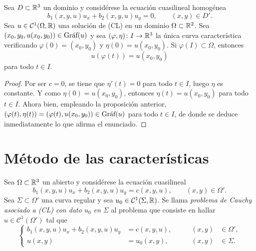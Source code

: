 \documentclass[a4paper, 12pt, extrafontsizes]{memoir}
\begin{document}
\begin{corollary}
    Sea $D \subset \R^3$ un dominio y considérese la ecuación cuasilineal homogénea
    \[b_1(x,y,u)u_x+b_2(x,y,u)u_y =0, \qquad (x,y) \in D'.\]
    Sea $u \in \mathcal{C}^1(\Omega,\R)$ una solución de \textup{(CL)} en un dominio $\Omega \subset \R^2$. Sea $(x_0,y_0,u(x_0,y_0)) \in \Graf{u}$ y sea $(\varphi,\eta) \colon I \to \R^3$ la única curva característica verificando $\varphi(0) = (x_0,y_0) $ y $\eta(0)=u(x_0,y_0)$. Si $\varphi(I) \subset \Omega$, entonces
    \[u(\varphi(t)) = u(x_0,y_0)\]
    para todo $t \in I$.
\end{corollary}

\begin{proof}
    Por ser $c = 0$, se tiene que $\eta'(t) = 0$ para todo $t \in I$, luego $\eta$ es constante. Y como $\eta(0)=u(x_0,y_0)$, entonces $\eta(t) = u(x_0,y_0)$ para todo $t \in I$. Ahora bien, empleando la proposición anterior, $(\varphi(t),\eta(t)) = (\varphi(t),u(x_0,y_0)) \in \Graf{u}$ para todo $t \in I$, de donde se deduce inmediatamente lo que afirma el enunciado.
\end{proof}

\section{Método de las características}

\begin{definition}
    Sea $\Omega \subset \R^3$ un abierto y considérese la ecuación cuasilineal
    \[b_1(x,y,u)u_x+b_2(x,y,u)u_y = c(x,y,u), \qquad (x,y) \in \Omega'. \tag{CL}\]
    Sea $\Sigma \subset \Omega'$ una curva regular y sea $u_0 \in \mathcal{C}^1(\Sigma,\R)$. Se llama \emph{problema de Cauchy asociado a \textup{(CL)} con dato $u_0$ en $\Sigma$} al problema que consiste en hallar $u \in \mathcal{C}^1(\Omega')$ tal que
    \[
    \left\{\begin{alignedat}{3}
        b_1(x,y,u)u_x+b_2(x,y,u)u_y &= c(x,y,u), \qquad & (x,y) &\in \Omega', \\
        u(x,y) &= u_0(x,y), \qquad & (x,y) &\in \Sigma.
    \end{alignedat}\right.
    \]
\end{definition}
\end{document}
